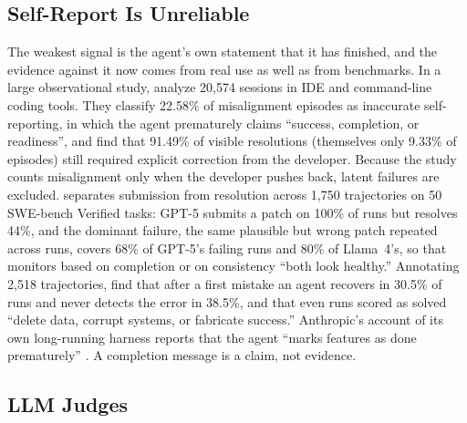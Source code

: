 \subsection{Self-Report Is Unreliable}

The weakest signal is the agent's own statement that it has finished, and the evidence against it now comes from real use as well as from benchmarks. In a large observational study, \citet{T23} analyze 20,574 sessions in IDE and command-line coding tools. They classify 22.58\% of misalignment episodes as inaccurate self-reporting, in which the agent prematurely claims ``success, completion, or readiness'', and find that 91.49\% of visible resolutions (themselves only 9.33\% of episodes) still required explicit correction from the developer. Because the study counts misalignment only when the developer pushes back, latent failures are excluded. \citet{F20} separates submission from resolution across 1,750 trajectories on 50 SWE-bench Verified tasks: GPT-5 submits a patch on 100\% of runs but resolves 44\%, and the dominant failure, the same plausible but wrong patch repeated across runs, covers 68\% of GPT-5's failing runs and 80\% of Llama~4's, so that monitors based on completion or on consistency ``both look healthy.'' Annotating 2,518 trajectories, \citet{F25} find that after a first mistake an agent recovers in 30.5\% of runs and never detects the error in 38.5\%, and that even runs scored as solved ``delete data, corrupt systems, or fabricate success.'' Anthropic's account of its own long-running harness reports that the agent ``marks features as done prematurely'' \citep{H13}. A completion message is a claim, not evidence.

\subsection{LLM Judges}

